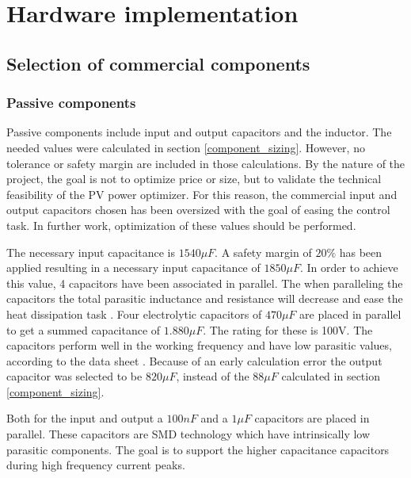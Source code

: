 
\chapter{Hardware implementation} \label{ch:hardware_implementation}


\section{Selection of commercial components}

\subsection{Passive components}

Passive components include input and output capacitors and the inductor. The needed values were calculated in section \ref{component_sizing}. However, no tolerance or safety margin are included in those calculations. By the nature of the project, the goal is not to optimize price or size, but to validate the technical feasibility of the PV power optimizer. For this reason, the commercial input and output capacitors chosen has been oversized with the goal of easing the control task. In further work, optimization of these values should be performed.

The necessary input capacitance is $1540 \mu F$. A safety margin of $20 \%$ has been applied resulting in a necessary input capacitance of $1850 \mu F$. In order to achieve this value, 4 capacitors have been associated in parallel. The when paralleling the capacitors the total parasitic inductance and resistance will decrease and ease the heat dissipation task \cite{capacitor_paracitics}. Four electrolytic capacitors of $470\mu F$ \cite{cin} are placed in parallel to get a summed capacitance of $1.880\mu F$. The rating for these is 100V. The capacitors perform well in the working frequency and have low parasitic values, according to the data sheet \cite{cin}. Because of an early calculation error the output capacitor was selected to be $820\mu F$\cite{cout}, instead of the $88\mu F$ calculated in section \ref{component_sizing}.

Both for the input and output a $100nF$ and a $1\mu F$ capacitors are placed in parallel. These capacitors are SMD technology which have intrinsically low parasitic components. The goal is to support the higher capacitance capacitors during high frequency current peaks\cite{paracitics_stuff}.

